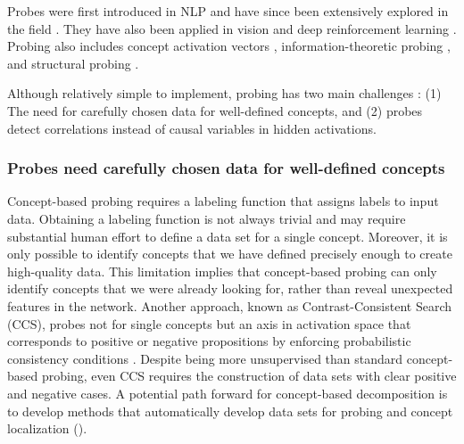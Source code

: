 Probes were first introduced in NLP \citep{kohn-2015-whats,gupta-etal-2015-distributional} and have since been extensively explored in the field \citep{conneau2018cramsinglevectorprobing,tenney2019bertrediscoversclassicalnlp,rogers2020primerbertologyknowbert,gurnee2023findingneuronshaystackcase,peters2018dissectingcontextualwordembeddings,burns2024discoveringlatentknowledgelanguage,marks2024geometrytruthemergentlinear}. They have also been applied in vision \citep{alain2018understandingintermediatelayersusing, kim_2018_activationvectors} and deep reinforcement learning \citep{McGrath_2022_alphazero, forde2023where}. Probing also includes concept activation vectors \citep{Kim_2018_Activation}, information-theoretic probing \citep{voita-titov-2020-information}, and structural probing \citep{hewitt-manning-2019-structural}.

Although relatively simple to implement, probing has two main challenges \citep{ravichander2021probingprobingparadigmdoes,belinkov-2022-probing}: (1) The need for carefully chosen data for well-defined concepts, and (2) probes detect correlations instead of causal variables in hidden activations.

\subsubsection{Probes need carefully chosen data for well-defined concepts}
\label{subsubsec:probes-data}

Concept-based probing requires a labeling function that assigns labels to input data. Obtaining a labeling function is not always trivial and may require substantial human effort to define a data set for a single concept. Moreover, it is only possible to identify concepts that we have defined precisely enough to create high-quality data. This limitation implies that concept-based probing can only identify concepts that we were already looking for, rather than reveal unexpected features in the network. Another approach, known as Contrast-Consistent Search (CCS), probes not for single concepts but an axis in activation space that corresponds to positive or negative propositions by enforcing probabilistic consistency conditions \citep{burns2024discoveringlatentknowledgelanguage}. Despite being more unsupervised than standard concept-based probing, even CCS requires the construction of data sets with clear positive and negative cases. A potential path forward for concept-based decomposition is to develop methods that automatically develop data sets for probing and concept localization \citep{shaham2024multimodalautomatedinterpretabilityagent} ().


